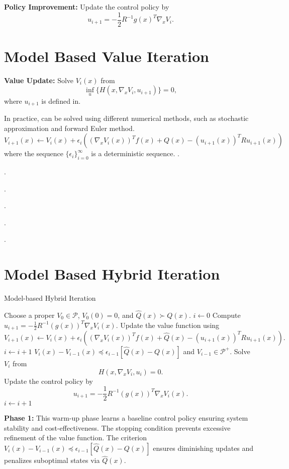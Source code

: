 \documentclass[12pt]{article}
\begin{document}
\textbf{Policy Improvement:} Update the control policy by
\[
u_{i+1} = -\frac{1}{2} R^{-1} g(x)^T \nabla_x V_i.
\]

\section{Model Based Value Iteration}
\textbf{Value Update:} Solve \( V_i(x) \) from
\[
\inf_u \{ H(x, \nabla_x V_i, u_{i+1}) \} = 0,
\]
where \( u_{i+1} \) is defined in.

In practice, can be solved using different numerical methods, such as stochastic approximation and forward Euler method.
\[
V_{i+1}(x) \leftarrow V_i(x) + \epsilon_i \left( (\nabla_x V_i(x))^T f(x) + Q(x) - (u_{i+1}(x))^T R u_{i+1}(x) \right)
\]
where the sequence \(\{\epsilon_i\}_{i=0}^{\infty}\) is a deterministic sequence.
.

.

.

.

.

.
\section{Model Based Hybrid Iteration}

\begin{algorithm}
\caption{Model-based Hybrid Iteration}
\begin{algorithmic}[1]
\State Choose a proper $V_0 \in \mathcal{P}$, $V_0(0) = 0$, and $\hat{Q}(x) \succ Q(x)$.
\State $i \gets 0$
\Repeat
    \State Compute $u_{i+1} = -\frac{1}{2} R^{-1} (g(x))^T \nabla_x V_i(x)$.
    \State Update the value function using
    \[
    V_{i+1}(x) \gets V_i(x) + \epsilon_i \left( (\nabla_x V_i(x))^T f(x) + \hat{Q}(x) - (u_{i+1}(x))^T R u_{i+1}(x) \right).
    \]
    \State $i \gets i + 1$
\Until $V_i(x) - V_{i-1}(x) \preceq \epsilon_{i-1}[\hat{Q}(x) - Q(x)]$ and $V_{i-1} \in \mathcal{P}^+$.
\Loop
    \State Solve $V_i$ from
    \[
    H(x, \nabla_x V_i, u_i) = 0.
    \]
    \State Update the control policy by
    \[
    u_{i+1} = -\frac{1}{2} R^{-1} (g(x))^T \nabla_x V_i(x).
    \]
    \State $i \gets i + 1$
\EndLoop
\end{algorithmic}
\end{algorithm}

\textbf{Phase 1:} This warm-up phase learns a baseline control policy ensuring system stability and cost-effectiveness. The stopping condition prevents excessive refinement of the value function. The criterion \( V_i(x) - V_{i-1}(x) \preceq \epsilon_{i-1}[\hat{Q}(x) - Q(x)] \) ensures diminishing updates and penalizes suboptimal states via \( \hat{Q}(x) \).
\end{document}
